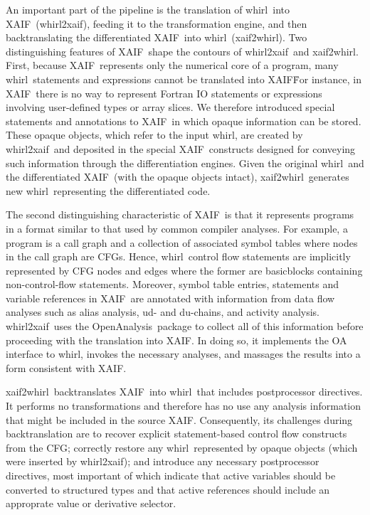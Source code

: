 \documentclass[11pt]{article}
\newcommand{\basicblock}{basicblock}
\newcommand{\OpenAnalysis}{OpenAnalysis}
\newcommand{\xaif}{XAIF}
\newcommand{\whirl}{whirl}
\newcommand{\whirlToxaif}{whirl2xaif}
\newcommand{\xaifTowhirl}{xaif2whirl}
\begin{document}
An important part of the pipeline is the translation of \whirl\ into
\xaif\ (\whirlToxaif), feeding it to the transformation engine, and
then backtranslating the differentiated \xaif\ into \whirl\
(\xaifTowhirl).  Two distinguishing features of \xaif\ shape the
contours of \whirlToxaif\ and \xaifTowhirl.  First, because \xaif\
represents only the numerical core of a program, many \whirl\
statements and expressions cannot be translated into \xaif\.  For
instance, in \xaif\ there is no way to represent Fortran IO statements
or expressions involving user-defined types or array slices.  We
therefore introduced special statements and annotations to \xaif\ in
which opaque information can be stored.  These opaque objects, which
refer to the input \whirl, are created by \whirlToxaif\ and deposited
in the special \xaif\ constructs designed for conveying such
information through the differentiation engines.  Given the original
\whirl\ and the differentiated \xaif\ (with the opaque objects
intact), \xaifTowhirl\ generates new \whirl\ representing the
differentiated code.  

The second distinguishing characteristic of \xaif\ is that it
represents programs in a format similar to that used by common
compiler analyses.  For example, a program is a call graph and a
collection of associated symbol tables where nodes in the call graph
are CFGs.  Hence, \whirl\ control flow statements are implicitly
represented by CFG nodes and edges where the former are {\basicblock}s
containing non-control-flow statements.  Moreover, symbol table
entries, statements and variable references in \xaif\ are annotated
with information from data flow analyses such as alias analysis, ud-
and du-chains, and activity analysis.  \whirlToxaif\ uses the
\OpenAnalysis\ package to collect all of this information before
proceeding with the translation into \xaif.  In doing so, it
implements the OA interface to \whirl, invokes the necessary analyses,
and massages the results into a form consistent with \xaif.

\xaifTowhirl\ backtranslates \xaif\ into \whirl\ that includes
postprocessor directives.  It performs no transformations and
therefore has no use any analysis information that might be included
in the source \xaif.  Consequently, its challenges during
backtranslation are to recover explicit statement-based control flow
constructs from the CFG; correctly restore any \whirl\ represented by
opaque objects (which were inserted by \whirlToxaif); and introduce
any necessary postprocessor directives, most important of which
indicate that active variables should be converted to structured types
and that active references should include an approprate value or
derivative selector.
\end{document}
